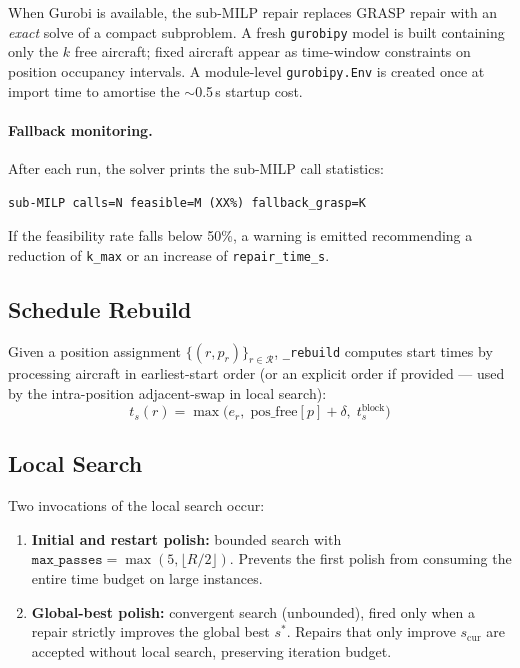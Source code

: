 When Gurobi is available, the sub-MILP repair replaces GRASP repair with an
\emph{exact} solve of a compact subproblem.  A fresh \texttt{gurobipy} model
is built containing only the $k$ free aircraft; fixed aircraft appear as
time-window constraints on position occupancy intervals.  A module-level
\texttt{gurobipy.Env} is created once at import time to amortise the
$\sim$0.5\,s startup cost.

\paragraph{Fallback monitoring.}
After each run, the solver prints the sub-MILP call statistics:
\begin{center}
\texttt{sub-MILP calls=N  feasible=M (XX\%)  fallback\_grasp=K}
\end{center}
If the feasibility rate falls below 50\%, a warning is emitted recommending
a reduction of \texttt{k\_max} or an increase of \texttt{repair\_time\_s}.

\subsection{Schedule Rebuild}

Given a position assignment $\{(r, p_r)\}_{r \in \mathcal{R}}$,
\texttt{\_rebuild} computes start times by processing aircraft in
earliest-start order (or an explicit order if provided — used by the
intra-position adjacent-swap in local search):
\[
    t_s(r) = \max\bigl(e_r,\; \text{pos\_free}[p] + \delta,\;
    t_s^{\text{block}}\bigr)
\]

\subsection{Local Search}

Two invocations of the local search occur:

\begin{enumerate}[noitemsep]
    \item \textbf{Initial and restart polish:} bounded search with
          $\texttt{max\_passes} = \max(5, \lfloor R/2 \rfloor)$.
          Prevents the first polish from consuming the entire time budget on
          large instances.
    \item \textbf{Global-best polish:} convergent search (unbounded), fired
          only when a repair strictly improves the global best $s^*$.
          Repairs that only improve $s_{\text{cur}}$ are accepted without
          local search, preserving iteration budget.
\end{enumerate}


